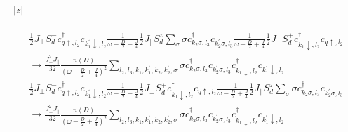 \documentclass[12pt]{revtex4-2}
\begin{document}
\paragraph{\(-|z|+\)}
\begin{equation}\begin{aligned}
	&\frac{1}{2}J_\perp S_d^- c^\dagger_{q \uparrow, l_2}c_{k_1^\prime \downarrow, l_2}\frac{1}{\omega - \frac{D}{2} + \frac{J}{4}}\frac{1}{2}J_\parallel S_d^z \sum_\sigma \sigma c^\dagger_{k_2 \sigma, l_3}c_{k_2^\prime \sigma, l_3} \frac{1}{\omega - \frac{D}{2} + \frac{J}{4}} \frac{1}{2}J_\perp S_d^+ c^\dagger_{k_1 \downarrow, l_2} c_{q \uparrow, l_2} \\
	&\longrightarrow \frac{J_\perp^2 J_\parallel}{32} \frac{n(D)}{\left(\omega - \frac{D}{2} + \frac{J}{4}\right)^2}\sum_{l_2, l_3, k_1,k_1^\prime,k_2,k_2^\prime,\sigma}\sigma c^\dagger_{k_2 \sigma, l_3}c_{k_2^\prime \sigma, l_3}c^\dagger_{k_1 \downarrow, l_2}c_{k_1^\prime \downarrow, l_2}
\end{aligned}\end{equation}
\begin{equation}\begin{aligned}
	&\frac{1}{2}J_\perp S_d^- c^\dagger_{q \uparrow, l_2}c_{k_1^\prime \downarrow, l_2} \frac{1}{\omega - \frac{D}{2} + \frac{J}{4}} \frac{1}{2}J_\perp S_d^+ c^\dagger_{k_1 \downarrow, l_2} c_{q \uparrow, l_2}\frac{-1}{\omega - \frac{D}{2} + \frac{J}{4}}\frac{1}{2}J_\parallel S_d^z \sum_\sigma \sigma c^\dagger_{k_2 \sigma, l_3}c_{k_2^\prime \sigma, l_3} \\
	&\longrightarrow \frac{J_\perp^2 J_\parallel}{32} \frac{n(D)}{\left(\omega - \frac{D}{2} + \frac{J}{4}\right)^2}\sum_{l_2, l_3, k_1,k_1^\prime,k_2,k_2^\prime,\sigma}\sigma c^\dagger_{k_2 \sigma, l_3}c_{k_2^\prime \sigma, l_3}c^\dagger_{k_1 \downarrow, l_2}c_{k_1^\prime \downarrow, l_2}
\end{aligned}\end{equation}
\end{document}
